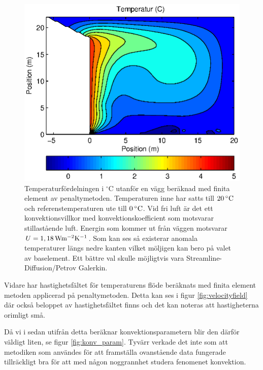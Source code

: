 \begin{figure}[hpbt]
\centering
\includegraphics{images/convectemperature.eps}
\caption{\label{fig:temp_dist}Temperaturfördelningen i $^\circ\mbox{C}$ utanför en vägg beräknad med finita element av
penaltymetoden. Temperaturen inne har satts till $\unit[20]{^\circ C}$ och
referenstemperaturen ute till $\unit[0]{^\circ C}$. Vid fri luft är det ett konvektionsvillkor med
konvektionskoefficient som motsvarar stillastående luft. Energin som kommer ut från väggen motsvarar
$U = \unit[1,18]{Wm^{-2}K^{-1}}$. Som kan ses så existerar anomala temperaturer längs nedre kanten vilket
möljigen kan bero på valet av baselement. Ett bättre val skulle möjligtvis
vara Streamline-Diffusion/Petrov Galerkin.}
\end{figure}


Vidare har hastighetsfältet för temperaturens flöde beräknats med finita element metoden applicerad på penaltymetoden. Detta kan ses i figur \ref{fig:velocityfield} där också beloppet av hastighetsfältet finns och det kan noteras att hastigheterna orimligt små.

Då vi i sedan utifrån detta beräknar konvektionsparametern blir den därför väldigt liten, se figur \ref{fig:konv_param}. Tyvärr verkade det inte som att metodiken som användes för att framställa ovanstående 
data fungerade tillräckligt bra för att med någon noggrannhet studera fenomenet 
konvektion. 


